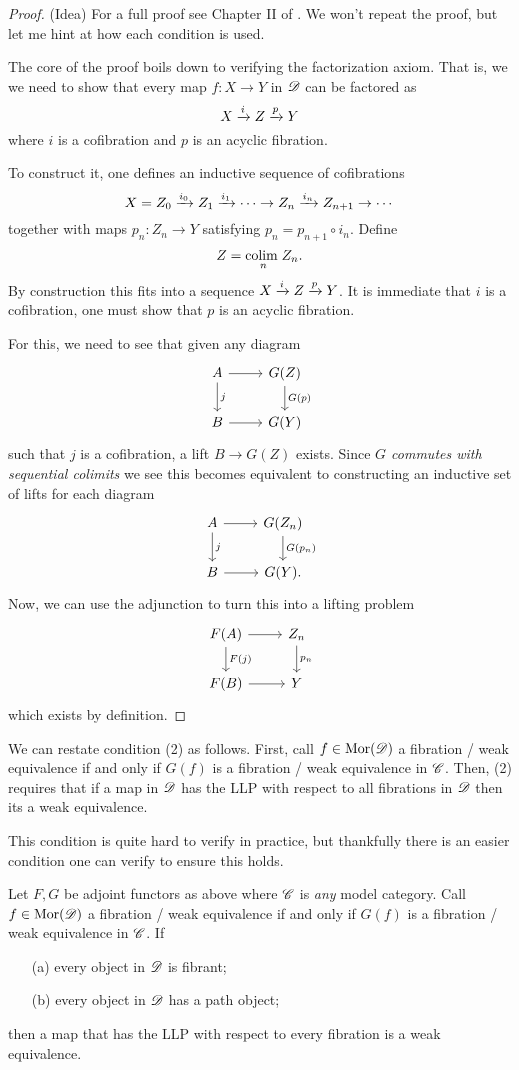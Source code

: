 \documentclass[11pt]{amsart}
\def\colim{{\rm colim}\;}
\begin{document}
\begin{proof}(Idea)
For a full proof see Chapter II of \cite{GJ}.
We won't repeat the proof, but let me hint at how each condition is used. 

The core of the proof boils down to verifying the factorization axiom. 
That is, we we need to show that every map $f : X \to Y$ in $\mathscr D$ can be factored as
\[
X \xrightarrow{i} Z \xrightarrow{p} Y
\]
where $i$ is a cofibration and $p$ is an acyclic fibration.

To construct it, one defines an inductive sequence of cofibrations
\[
X = Z_0 \xrightarrow{i_0} Z_1 \xrightarrow{i_1} \cdots \to Z_n \xrightarrow{i_n} Z_{n+1} \to \cdots
\]
together with maps $p_n : Z_n \to Y$ satisfying $p_n = p_{n+1} \circ i_n$. 
Define 
\[
Z = \underset{n}{\colim} Z_n .
\]
By construction this fits into a sequence $X \xrightarrow{i} Z \xrightarrow{p} Y$. 
It is immediate that $i$ is a cofibration, one must show that $p$ is an acyclic fibration. 

For this, we need to see that given any diagram
\[
\begin{tikzcd}
A \ar[r] \ar[d,"j"] & G(Z) \ar[d, "G(p)"] \\
B \ar[r] & G(Y) 
\end{tikzcd}
\]
such that $j$ is a cofibration, a lift $B \to G(Z)$ exists. 
Since {\em $G$ commutes with sequential colimits} we see this becomes equivalent to constructing an inductive set of lifts for each diagram
\[
\begin{tikzcd}
A \ar[r] \ar[d,"j"] & G(Z_n) \ar[d, "G(p_n)"] \\
B \ar[r] & G(Y) .
\end{tikzcd}
\]
Now, we can use the adjunction to turn this into a lifting problem
\[
\begin{tikzcd}
F(A) \ar[r] \ar[d,"F(j)"] & Z_n \ar[d, "p_n"] \\
F(B) \ar[r] & Y 
\end{tikzcd}
\]
which exists by definition. 
\end{proof}


We can restate condition (2) as follows. 
First, call $f \in {\rm Mor}(\mathscr D)$ a fibration / weak equivalence if and only if $G(f)$ is a fibration / weak equivalence in $\mathscr C$. 
Then, (2) requires that if a map in $\mathscr D$ has the LLP with respect to all fibrations in $\mathscr D$ then its a weak equivalence. 

This condition is quite hard to verify in practice, but thankfully there is an easier condition one can verify to ensure this holds. 

\begin{prop}\label{prop: easy}
Let $F,G$ be adjoint functors as above where $\mathscr C$ is {\em any} model category. 
Call $f \in {\rm Mor}(\mathscr D)$ a fibration / weak equivalence if and only if $G(f)$ is a fibration / weak equivalence in $\mathscr C$. 
If
\begin{itemize}
\item[(a)] every object in $\mathscr D$ is fibrant;
\item[(b)] every object in $\mathscr D$ has a path object;
\end{itemize}
then a map that has the LLP with respect to every fibration is a weak equivalence.
\end{prop}
\end{document}
